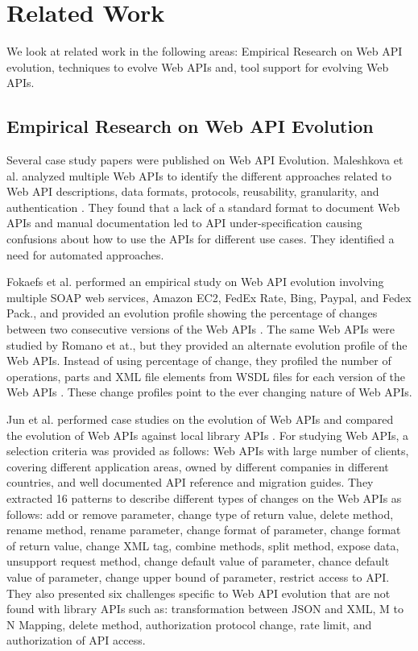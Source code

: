 \section{Related Work}

We look at related work in the following areas: Empirical Research on Web API evolution, techniques to evolve Web APIs and, tool support for evolving Web APIs.

\subsection{Empirical Research on Web API Evolution} %
\label{sub:empirical_research}
Several case study papers were published on Web API Evolution. Maleshkova et al. analyzed multiple Web APIs to identify the different approaches related to Web API descriptions, data formats, protocols, reusability, granularity, and authentication \cite{maleshkova}. They found that a lack of a standard format to document Web APIs and manual documentation led to API under-specification causing confusions about how to use the APIs for different use cases. They identified a need for automated approaches.

Fokaefs et al. performed an empirical study on Web API evolution involving multiple SOAP web services, Amazon EC2, FedEx Rate, Bing, Paypal, and Fedex Pack., and provided an evolution profile showing the percentage of changes between two consecutive versions of the Web APIs \cite{fokaefs_2011_empirical}. The same Web APIs were studied by Romano et at., but they provided an alternate evolution profile of the Web APIs. Instead of using percentage of change, they profiled the number of operations, parts and XML file elements from WSDL files for each version of the Web APIs \cite{wsdl_diff_2012}. These change profiles point to the ever changing nature of Web APIs.

Jun et al. performed case studies on the evolution of Web APIs and compared the evolution of Web APIs against local library APIs \cite{li_client_2013}. For studying Web APIs, a selection criteria was provided as follows: Web APIs with large number of clients, covering different application areas, owned by different companies in different countries, and well documented API reference and migration guides. They extracted 16 patterns to describe different types of changes on the Web APIs as follows: add or remove parameter, change type of return value, delete method, rename method, rename parameter, change format of parameter, change format of return value, change XML tag, combine methods, split method, expose data, unsupport request method, change default value of parameter, chance default value of parameter, change upper bound of parameter, restrict access to API. They also presented six challenges specific to Web API evolution that are not found with library APIs such as: transformation between JSON and XML, M to N Mapping, delete method, authorization protocol change, rate limit, and authorization of API access.

